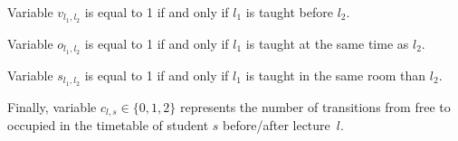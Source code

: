 \documentclass[twocolumn,natbib]{svjour3}          %
\begin{document}
Variable $v_{l_1,l_2}$ is equal to 1 if and only if $l_1$ is taught before $l_2$. 
\begin{comment}
v_{l_1,l_2}= \begin{cases}
1 & \textrm{if} \ a^{l_1} + len_{l_1} \leq a^{l_2}\\
0 & \textrm{otherwise}  \end{cases}  \forall_{l_1\in L, l_2\in L}.  
\end{comment}
Variable $o_{l_1,l_2}$ is equal to 1 if and only if $l_1$ is taught at the same time as $l_2$.
\begin{comment}
o_{l_1,l_2}= \begin{cases}
1 & \textrm{if} \  v_{l_1,l_2} + v_{l_2,l_1} = 0\\
0 & \textrm{otherwise}  \end{cases}  \forall_{l_1\in L, l_2\in L}.  
\end{comment}
Variable $s_{l_1,l_2}$ is equal to 1 if and only if $l_1$ is taught in the same room than $l_2$. 
\begin{comment}
s_{l_1,l_2}= \begin{cases}
1 & \textrm{if} \ x_{l_1,r} = x_{l_2,r}\\
0 & \textrm{otherwise}  \end{cases}   \forall_{l_1\in L, l_2\in L, r \in R}.
\end{comment}
 Finally, variable $c_{l,s} \in \{0,1,2\}$ represents the number of transitions from free to occupied in the timetable of student $s$ before/after lecture~$l$. 
\begin{comment}
g_{l_1,l_2,s}= \begin{cases}
1 & \textrm{if} \  a^{l_1} + len_{l_1} = a^{l_2}\\
0 & \textrm{otherwise}  \end{cases}  \forall_{l_1\in S_l, l_2\in S_l, s\in S}.  
\end{comment}
\begin{comment}
c_{l,s}= \begin{cases}
1 & \textrm{if} \  \sum_{l_2 \in S_l}v_{l,l_2} + \sum_{l_2 \in S_l} v_{l_2,l}\\
0 & \textrm{otherwise}  \end{cases}  \forall_{l\in S_l, s\in S}.  
\end{comment}
\end{document}
